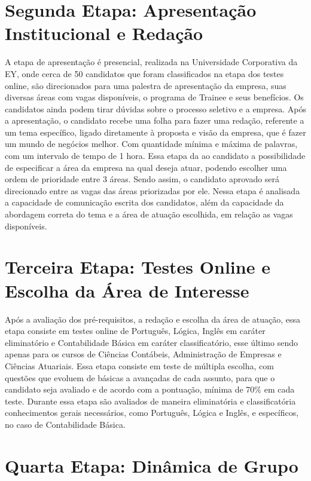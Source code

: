 \section{Segunda Etapa: Apresentação Institucional e Redação}

A etapa de apresentação é presencial, realizada na Universidade Corporativa da EY, onde cerca de 50 candidatos que foram classificados na etapa dos testes online, são direcionados para uma palestra de apresentação da empresa, suas diversas áreas com vagas disponíveis, o programa de Trainee e seus benefícios. Os candidatos ainda podem tirar dúvidas sobre o processo seletivo e a empresa.
Após a apresentação, o candidato recebe uma folha para fazer uma redação, referente a um tema específico, ligado diretamente à proposta e visão da empresa, que é fazer um mundo de negócios melhor. Com quantidade mínima e máxima de palavras, com um intervalo de tempo de 1 hora. 
Essa etapa da ao candidato a possibilidade de especificar a área da empresa na qual deseja atuar, podendo escolher uma ordem de prioridade entre 3 áreas. Sendo assim, o candidato aprovado será direcionado entre as vagas das áreas priorizadas por ele.
Nessa etapa é analisada a capacidade de comunicação escrita dos candidatos, além da capacidade da abordagem correta do tema e a área de atuação escolhida, em relação as vagas disponíveis.




\section{Terceira Etapa: Testes Online e Escolha da Área de Interesse}

Após a avaliação dos pré-requisitos, a redação e escolha da área de atuação, essa etapa consiste em testes online de Português, Lógica, Inglês em caráter eliminatório e Contabilidade Básica em caráter classificatório, esse último sendo apenas para os cursos de Ciências Contábeis, Administração de Empresas e Ciências Atuariais.
Essa etapa consiste em teste de múltipla escolha, com questões que evoluem de básicas a avançadas de cada assunto, para que o candidato seja avaliado e de acordo com a pontuação, mínima de 70\% em cada teste.
Durante essa etapa são avaliados de maneira eliminatória e classificatória conhecimentos gerais necessários, como Português, Lógica e Inglês, e específicos, no caso de Contabilidade Básica.




\section{Quarta Etapa: Dinâmica de Grupo}

